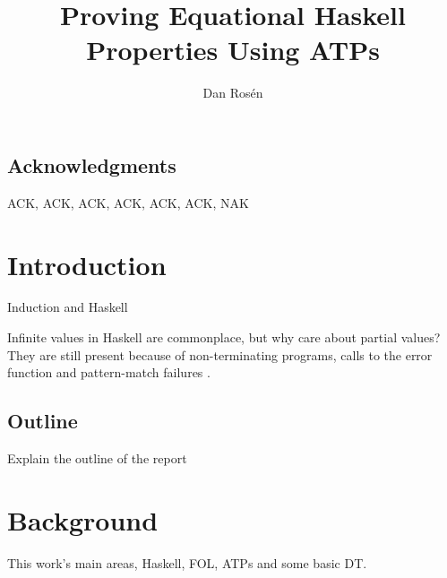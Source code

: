 \documentclass{report}
\begin{document}
\title{Proving Equational Haskell Properties Using ATPs}
\author{Dan Rosén}
\maketitle


\newpage
{}


\newpage
\pagestyle{empty}
\section*{Acknowledgments}
\vspace{5mm}
ACK, ACK, ACK, ACK, ACK, ACK, NAK


\newpage
\tableofcontents
{}

\newpage
\setcounter{page}{1}

\chapter{Introduction}

Induction and Haskell

Infinite values in Haskell are commonplace, but why care about partial
values? They are still present because of non-terminating programs,
calls to the error function and pattern-match
failures \cite{chasingbot}.

\section{Outline}

Explain the outline of the report

\chapter{Background}

This work's main areas, Haskell, FOL, ATPs and some basic DT.
\end{document}
